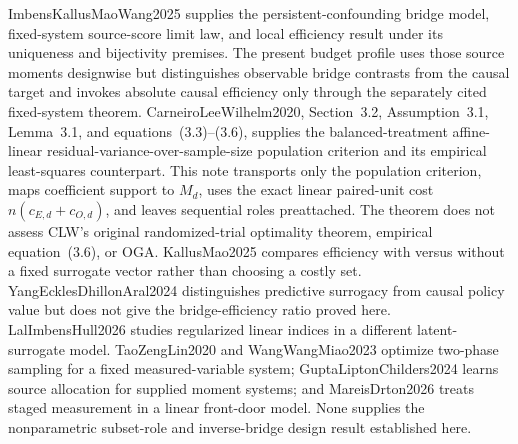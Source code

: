 ImbensKallusMaoWang2025 supplies the persistent-confounding bridge model, fixed-system source-score limit law, and local efficiency result under its uniqueness and bijectivity premises. The present budget profile uses those source moments designwise but distinguishes observable bridge contrasts from the causal target and invokes absolute causal efficiency only through the separately cited fixed-system theorem. CarneiroLeeWilhelm2020, Section~3.2, Assumption~3.1, Lemma~3.1, and equations~(3.3)--(3.6), supplies the balanced-treatment affine-linear residual-variance-over-sample-size population criterion and its empirical least-squares counterpart. This note transports only the population criterion, maps coefficient support to \(M_d\), uses the exact linear paired-unit cost \(n(c_{E,d}+c_{O,d})\), and leaves sequential roles preattached. The theorem does not assess CLW's original randomized-trial optimality theorem, empirical equation~(3.6), or OGA. KallusMao2025 compares efficiency with versus without a fixed surrogate vector rather than choosing a costly set. YangEcklesDhillonAral2024 distinguishes predictive surrogacy from causal policy value but does not give the bridge-efficiency ratio proved here. LalImbensHull2026 studies regularized linear indices in a different latent-surrogate model. TaoZengLin2020 and WangWangMiao2023 optimize two-phase sampling for a fixed measured-variable system; GuptaLiptonChilders2024 learns source allocation for supplied moment systems; and MareisDrton2026 treats staged measurement in a linear front-door model. None supplies the nonparametric subset-role and inverse-bridge design result established here.